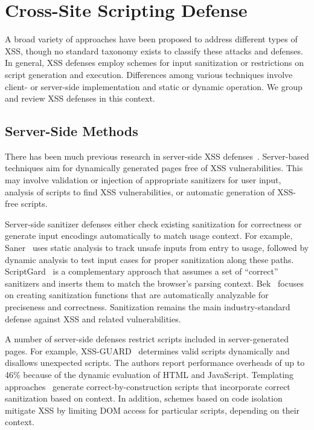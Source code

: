 \section{Cross-Site Scripting Defense}

A broad variety of approaches have been proposed to address different
types of XSS, though no standard taxonomy exists to classify these
attacks and defenses. In general, XSS defenses employ schemes for
input sanitization or restrictions on script generation and execution.
Differences among various techniques involve client- or server-side
implementation and static or dynamic operation. We group and review
XSS defenses in this context.

\subsection{Server-Side Methods}

There has been much previous research in server-side XSS
defenses~\cite{saxena11:scriptgard,balzarotti08:saner,samuel11:templating,google13:autoescape,bisht08:xssguard,nguyen05:hardening,pietraszek05,su06:sqlcheck,jovanovic06:pixy-improved,louw09:blueprint,vangundy09:noncespaces}.
Server-based techniques aim for dynamically generated pages free of
XSS vulnerabilities. This may involve validation or injection of
appropriate sanitizers for user input, analysis of scripts to find XSS
vulnerabilities, or automatic generation of XSS-free scripts.

Server-side sanitizer defenses either check existing sanitization for
correctness or generate input encodings automatically to match usage
context. For example, Saner~\cite{balzarotti08:saner} uses static
analysis to track unsafe inputs from entry to usage, followed by
dynamic analysis to test input cases for proper sanitization along
these paths. {\sc ScriptGard}~\cite{saxena11:scriptgard} is a
complementary approach that assumes a set of ``correct'' sanitizers
and inserts them to match the browser's parsing context. {\sc
  Bek}~\cite{hooimeijer11:bek} focuses on creating sanitization
functions that are automatically analyzable for preciseness and
correctness. Sanitization remains the main industry-standard defense
against XSS and related vulnerabilities.

A number of server-side defenses restrict scripts included in
server-generated pages. For example, XSS-GUARD~\cite{bisht08:xssguard}
determines valid scripts dynamically and disallows unexpected scripts.
The authors report performance overheads of up to 46\% because of the
dynamic evaluation of HTML and JavaScript. Templating
approaches~\cite{samuel11:templating,google13:autoescape,robertson09}
generate correct-by-construction scripts that incorporate correct
sanitization based on context. In addition, schemes based on code
isolation~\cite{livshits07,athanasopoulos09,akhawe12:privilege}
mitigate XSS by limiting DOM access for particular scripts, depending
on their context.

